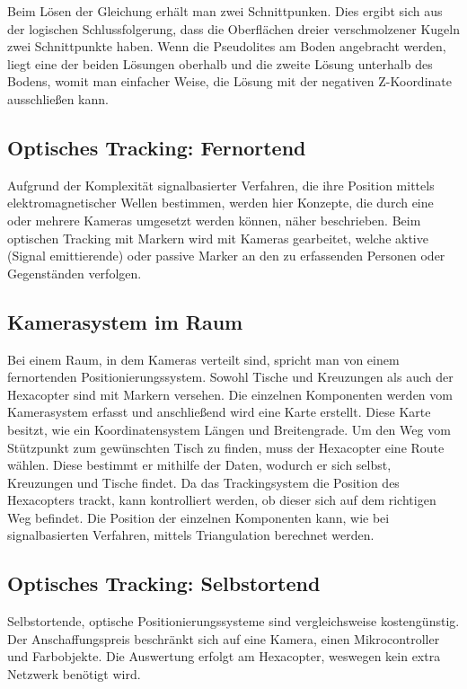       Beim Lösen der Gleichung erhält man zwei Schnittpunken. Dies ergibt sich aus der logischen Schlussfolgerung, dass die Oberflächen dreier verschmolzener Kugeln zwei Schnittpunkte haben.
      Wenn die Pseudolites am Boden angebracht werden, liegt eine der beiden Lösungen oberhalb und die zweite Lösung unterhalb des Bodens, womit man einfacher Weise, die Lösung mit der negativen Z-Koordinate ausschließen kann.

    \subsection{Optisches Tracking: Fernortend}
    Aufgrund der Komplexität signalbasierter Verfahren, die ihre Position mittels elektromagnetischer Wellen bestimmen, werden hier Konzepte, die durch eine oder mehrere Kameras umgesetzt werden können, näher beschrieben. Beim optischen Tracking mit Markern wird mit Kameras gearbeitet, welche aktive (Signal emittierende) oder passive Marker an den zu erfassenden Personen oder Gegenständen verfolgen.

  \subsection*{Kamerasystem im Raum}
  Bei einem Raum, in dem Kameras verteilt sind, spricht man von einem fernortenden Positionierungssystem.
  Sowohl Tische und Kreuzungen als auch der Hexacopter sind mit Markern versehen. Die einzelnen Komponenten werden vom Kamerasystem erfasst und anschließend wird eine Karte erstellt. Diese Karte besitzt, wie ein Koordinatensystem Längen und Breitengrade.
  Um den Weg vom Stützpunkt zum gewünschten Tisch zu finden, muss der Hexacopter eine Route wählen. Diese bestimmt er mithilfe der Daten, wodurch er sich selbst, Kreuzungen und Tische findet. Da das Trackingsystem die Position des Hexacopters trackt, kann kontrolliert werden, ob dieser sich auf dem richtigen Weg befindet. Die Position der einzelnen Komponenten kann, wie bei signalbasierten Verfahren, mittels Triangulation berechnet werden.

  \subsection{Optisches Tracking: Selbstortend}
  Selbstortende, optische Positionierungssysteme sind vergleichsweise kostengünstig. Der Anschaffungspreis beschränkt sich auf eine Kamera, einen Mikrocontroller und Farbobjekte. Die Auswertung erfolgt am Hexacopter, weswegen kein extra Netzwerk benötigt wird.

